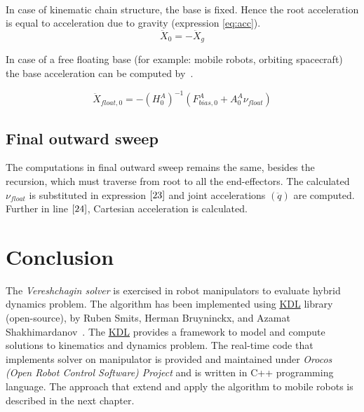 \paragraph{}In case of kinematic chain structure, the base is fixed. Hence the root acceleration is equal to acceleration due to gravity (expression \ref{eq:acc}). 
\begin{equation}
	\label{eq:acc}
	\ddot{X}_0 = -\ddot{X}_g
\end{equation}

In case of a free floating base (for example: mobile robots, orbiting spacecraft) the base acceleration can be computed by~\cite{vereshchagin1989modeling}. 

\begin{equation}\label{eq:cartesian-acceleration}
\ddot{X}_{float, 0} = -(H_0^A)^{-1} (F_{bias, 0}^A + A_0^A  \nu_{float})
\end{equation}


\subsection{Final outward sweep}
The computations in final outward sweep remains the same, besides the recursion, which must traverse from root to all the end-effectors. The calculated $\nu_{float}$ is substituted in expression $\ref{23}$ and joint accelerations $(\ddot{q})$ are computed. Further in line $\ref{24}$, Cartesian acceleration is calculated.

\section{Conclusion}
The \textit{Vereshchagin solver} is exercised in robot manipulators to evaluate hybrid dynamics problem. \cite{KDLopensource} The algorithm has been implemented using \hyperref[kdl]{KDL} library (open-source), by Ruben Smits, Herman Bruyninckx, and Azamat Shakhimardanov~\cite{KDLopensource}. The \hyperref[kdl]{KDL} provides a framework to model and compute solutions to kinematics and dynamics problem. The real-time code that implements solver on manipulator is provided and maintained under \textit{Orocos (Open Robot Control Software) Project} and is written in C++ programming language. The approach that extend and apply the algorithm to mobile robots is described in the next chapter. 


%
%
%
%
